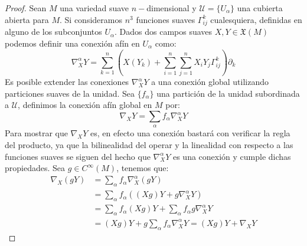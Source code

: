 \begin{proof}
  Sean $M$ una variedad suave $n-$dimensional y $\mathcal{U} = \{U_{\alpha}\}$ una cubierta abierta para $M$. Si consideramos $n^{3}$ funciones suaves $\Gamma_{ij}^{k}$ cualesquiera, definidas en alguno de los subconjuntos $U_{\alpha}$. Dados dos campos suaves $X,Y \in \mathfrak{X}(M)$ podemos definir una conexión afín en $U_{\alpha}$ como:
  \[
    \nabla_{X}^{\alpha} Y = \sum_{k=1}^{n} 
    \left( X(Y_{k}) + \sum_{i=1}^{n}\sum_{j=1}^{n} X_{i}Y_{j} \Gamma_{ij}^{k} \right) \partial_{k}
  \]
  Es posible extender las conexiones $\nabla_{X}^{\alpha} Y$ a una conexión global utilizando particiones suaves de la unidad. Sea $\{f_{\alpha}\}$ una partición de la unidad subordinada a $\mathcal{U}$, definimos la conexión afín global en $M$ por:
  \[
    \nabla_{X} Y = \sum_{\alpha} f_{\alpha} \nabla_{X}^{\alpha}Y
  \]
  Para mostrar que $\nabla_{X}Y$ es, en efecto una conexión bastará con verificar la regla del producto, ya que la bilinealidad del operar y la linealidad con respecto a las funciones suaves se siguen del hecho que $\nabla_{X}^{\alpha}Y$ es una conexión y cumple dichas propiedades. Sea $g \in C^{\infty}(M)$, tenemos que:
  \begin{align*}
    \nabla_{X}(gY) & = \sum_{\alpha} f_{\alpha} \nabla_{X}^{\alpha} (gY)\\
    &= \sum_{\alpha} f_{\alpha} \left((Xg)Y + g\nabla_{X}^{\alpha}Y \right) \\
    &= \sum_{\alpha} f_{\alpha} (Xg) Y + \sum_{\alpha} f_{\alpha} g \nabla_{X}^{\alpha}Y \\
    &= (Xg)Y + g \sum_{\alpha} f_{\alpha}\nabla_{X}^{\alpha} Y = (Xg)Y + \nabla_{X}Y
  \end{align*}
\end{proof}
